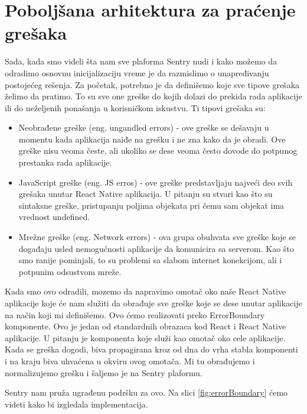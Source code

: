 \documentclass[12pt,oneside]{memoir}
\begin{document}
\section{Poboljšana arhitektura za praćenje grešaka}

Sada, kada smo videli šta nam sve plaforma Sentry nudi i kako možemo da odradimo osnovnu inicijalizaciju vreme je da razmislimo o unapređivanju postojećeg rešenja. Za početak, potrebno je da definišemo koje sve tipove grešaka želimo da pratimo. To su sve one greške do kojih dolazi do prekida rada aplikacije ili do neželjenih ponašanja u korisničkom iskustvu. Ti tipovi grešaka su:

\begin{itemize}
\item Neobrađene greške (eng. ungandled errors) - ove greške se dešavaju u momentu kada aplikacija naiđe na grešku i ne zna kako da je obradi. Ove greške nisu veoma česte, ali ukoliko se dese veoma često dovode do potpunog prestanka rada aplikacije.
\item JavaScript greške (eng. JS erros) - ove greške predstavljaju najveći deo svih grešaka unutar React Native aplikacija. U pitanju su stvari kao što su sintaksne greške, pristupanju poljima objekata pri čemu sam objekat ima vrednost undefined.
\item Mrežne greške (eng. Network errors) - ova grupa obuhvata sve greške koje se događaju usled nemogućnosti aplikacije da komunicira sa serverom. Kao što smo ranije pominjali, to su problemi sa slabom internet konekcijom, ali i potpunim odsustvom mreže.
\end{itemize}

Kada smo ovo odradili, mozemo da napravimo omotač oko naše React Native aplikacije koje će nam služiti da obrađuje sve greške koje se dese unutar aplikacije na način koji mi definišemo. Ovo ćemo realizovati preko ErrorBoundary komponente. Ovo je jedan od standardnih obrazaca kod React i React Native aplikacije. U pitanju je komponenta koje služi kao omotač oko cele aplikacije. Kada se greška dogodi, biva propagirana kroz od dna do vrha stabla komponenti i na kraju biva uhvaćena u okviru ovog omotača. Mi tu obrađujemo i normalizujemo grešku i šaljemo je na Sentry plaformu. \newline

\newline

Sentry nam pruža ugrađenu podršku za ovo. Na slici \ref{fig:errorBoundary} ćemo videti kako bi izgledala implementacija.
\end{document}
